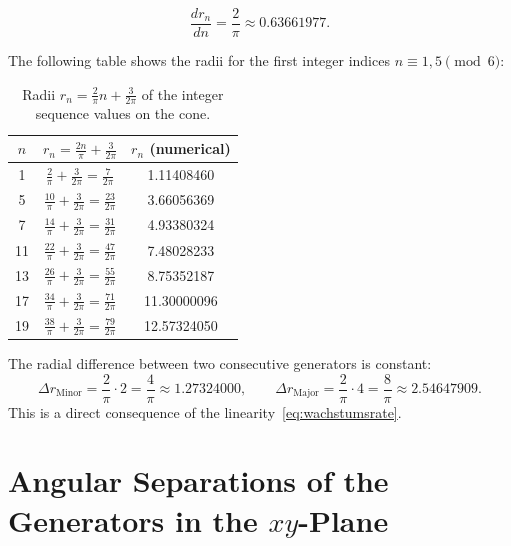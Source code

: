 \begin{equation}\label{eq:wachstumsrate}
  \frac{dr_n}{dn} = \frac{2}{\pi} \approx 0.63661977.
\end{equation}

The following table shows the radii for the first integer
indices $n \equiv 1, 5 \pmod{6}$:

\begin{table}[H]
\centering
\renewcommand{\arraystretch}{1.2}
\caption{Radii $r_n = \tfrac{2}{\pi}n + \tfrac{3}{2\pi}$ of the integer
  sequence values on the cone.}
\begin{tabular}{ccc}
\toprule
$n$ & $r_n = \tfrac{2n}{\pi}+\tfrac{3}{2\pi}$ & $r_n$ (numerical) \\
\midrule
 1  & $\tfrac{2}{\pi}+\tfrac{3}{2\pi} = \tfrac{7}{2\pi}$  &  1.11408460 \\
 5  & $\tfrac{10}{\pi}+\tfrac{3}{2\pi} = \tfrac{23}{2\pi}$ &  3.66056369 \\
 7  & $\tfrac{14}{\pi}+\tfrac{3}{2\pi} = \tfrac{31}{2\pi}$ &  4.93380324 \\
11  & $\tfrac{22}{\pi}+\tfrac{3}{2\pi} = \tfrac{47}{2\pi}$ &  7.48028233 \\
13  & $\tfrac{26}{\pi}+\tfrac{3}{2\pi} = \tfrac{55}{2\pi}$ &  8.75352187 \\
17  & $\tfrac{34}{\pi}+\tfrac{3}{2\pi} = \tfrac{71}{2\pi}$ & 11.30000096 \\
19  & $\tfrac{38}{\pi}+\tfrac{3}{2\pi} = \tfrac{79}{2\pi}$ & 12.57324050 \\
\bottomrule
\end{tabular}
\end{table}

\begin{bemerkung}
The radial difference between two consecutive generators
is constant:
\[
  \Delta r_{\text{Minor}} = \frac{2}{\pi}\cdot 2 = \frac{4}{\pi}
  \approx 1.27324000,
  \qquad
  \Delta r_{\text{Major}} = \frac{2}{\pi}\cdot 4 = \frac{8}{\pi}
  \approx 2.54647909.
\]
This is a direct consequence of the linearity~\eqref{eq:wachstumsrate}.
\end{bemerkung}

\section{Angular Separations of the Generators in the \texorpdfstring{$xy$}{xy}-Plane}

